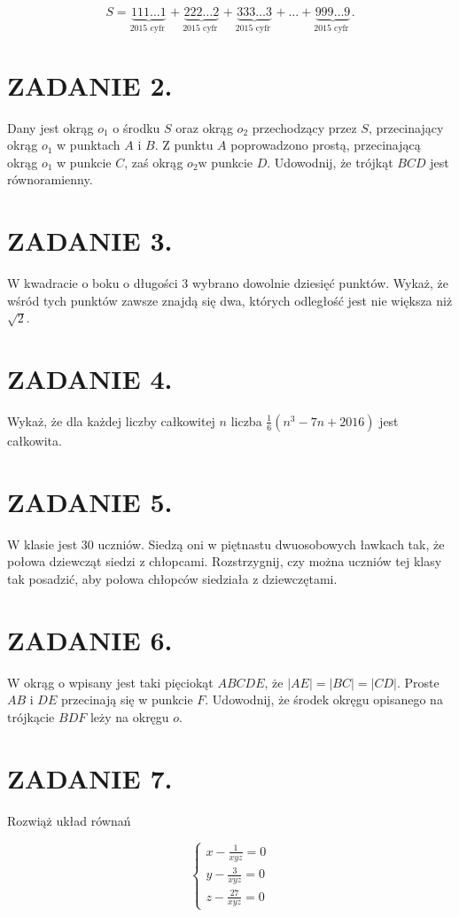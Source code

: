 \documentclass[10pt]{article}
\begin{document}
\[
S=\underbrace{111 \ldots 1}_{2015 \text { cyfr }}+\underbrace{222 \ldots 2}_{2015 \text { cyfr }}+\underbrace{333 \ldots 3}_{2015 \text { cyfr }}+\ldots+\underbrace{999 \ldots 9}_{2015 \text { cyfr }} .
\]

\section*{ZADANIE 2.}
Dany jest okrąg \(o_{1}\) o środku \(S\) oraz okrąg \(o_{2}\) przechodzący przez \(S\), przecinający okrąg \(o_{1}\) w punktach \(A\) i \(B\). Z punktu \(A\) poprowadzono prostą, przecinającą okrąg \(o_{1}\) w punkcie \(C\), zaś okrąg \(o_{2} \mathrm{w}\) punkcie \(D\). Udowodnij, że trójkąt \(B C D\) jest równoramienny.

\section*{ZADANIE 3.}
W kwadracie o boku o długości 3 wybrano dowolnie dziesięć punktów. Wykaż, że wśród tych punktów zawsze znajdą się dwa, których odległość jest nie większa niż \(\sqrt{2}\).

\section*{ZADANIE 4.}
Wykaż, że dla każdej liczby całkowitej \(n\) liczba \(\frac{1}{6}\left(n^{3}-7 n+2016\right)\) jest całkowita.

\section*{ZADANIE 5.}
W klasie jest 30 uczniów. Siedzą oni w piętnastu dwuosobowych ławkach tak, że połowa dziewcząt siedzi z chłopcami. Rozstrzygnij, czy można uczniów tej klasy tak posadzić, aby połowa chłopców siedziała z dziewczętami.

\section*{ZADANIE 6.}
W okrąg o wpisany jest taki pięciokąt \(A B C D E\), że \(|A E|=|B C|=|C D|\). Proste \(A B\) i \(D E\) przecinają się w punkcie \(F\). Udowodnij, że środek okręgu opisanego na trójkącie \(B D F\) leży na okręgu \(o\).

\section*{ZADANIE 7.}
Rozwiąż układ równań

\[
\left\{\begin{array}{l}
x-\frac{1}{x y z}=0 \\
y-\frac{3}{x y z}=0 \\
z-\frac{27}{x y z}=0
\end{array}\right.
\]
\end{document}
